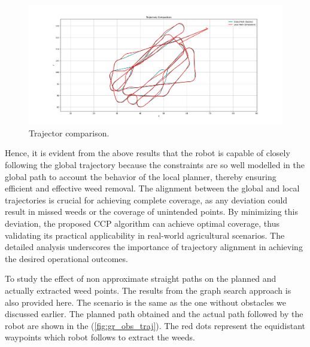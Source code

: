 

\begin{figure}[htbp]
    \centering
    \includegraphics[width=\textwidth]{Images/real_robot/obs_compare.png}
    \caption{Trajector comparison.}
    \label{fig:traj_compare}
\end{figure}


Hence, it is evident from the above results that the robot is capable of closely following the global trajectory because the constraints are so well modelled in the global path to account the behavior of the local planner, thereby ensuring efficient and effective weed removal. The alignment between the global and local trajectories is crucial for achieving complete coverage, as any deviation could result in missed weeds or the coverage of unintended points. By minimizing this deviation, the proposed CCP algorithm can achieve optimal coverage, thus validating its practical applicability in real-world agricultural scenarios. The detailed analysis underscores the importance of trajectory alignment in achieving the desired operational outcomes.

\vspace{3mm}   

To study the effect of non approximate straight paths on the planned and actually extracted weed points. The results from the graph search approach is also provided here. The scenario is the same as the one without obstacles we discussed earlier. The planned path obtained and the actual path followed by the robot are shown in the (\autoref{fig:gr_obs_traj}). The red dots represent the equidistant waypoints which robot follows to extract the weeds.

